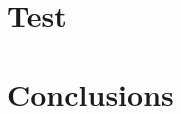 \documentclass[sigplan,screen]{acmart}
\begin{document}
\section{Test}
\section{Conclusions}


\end{document}
